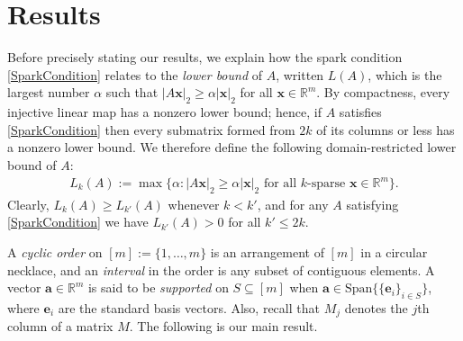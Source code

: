 \documentclass[journal, twocolumn]{IEEEtran}
\begin{document}

\section{Results}\label{Results}

Before precisely stating our results, we explain how the spark condition \eqref{SparkCondition} relates to the \emph{lower bound} \cite{Grcar10} of $A$, written $L(A)$, which is the largest number $\alpha$ such that $|A\mathbf{x}|_2 \geq \alpha|\mathbf{x}|_2$ for all $\mathbf{x} \in \mathbb{R}^m$. By compactness, every injective linear map has a nonzero lower bound; hence, if $A$ satisfies \eqref{SparkCondition} then every submatrix formed from $2k$ of its columns or less has a nonzero lower bound. We therefore define the following domain-restricted lower bound of $A$:
\begin{align*}
L_k(A) := \max \{ \alpha : |A\mathbf{x}|_2 \geq \alpha|\mathbf{x}|_2 \text{ for all $k$-sparse } \mathbf{x} \in \mathbb{R}^m\}.
\end{align*} 
Clearly, $L_k(A) \geq L_{k'}(A)$ whenever $k < k'$, and for any $A$ satisfying \eqref{SparkCondition} we have $L_{k'}(A) > 0$ for all $k' \leq 2k$. 

A \textit{cyclic order} on $[m] := \{1, \ldots,m\}$ is an arrangement of $[m]$ in a circular necklace, and an \textit{interval} in the order is any subset of contiguous elements. A vector $\mathbf{a} \in \mathbb{R}^m$ is said to be \emph{supported} on $S \subseteq [m]$ when $\mathbf{a} \in \text{Span}\{ \{\mathbf{e}_i\}_{i\in S}\}$, where $\mathbf{e}_i$ are the standard basis vectors.  Also, recall that $M_j$ denotes the $j$th column of a matrix $M$. The following is our main result.
\end{document}
